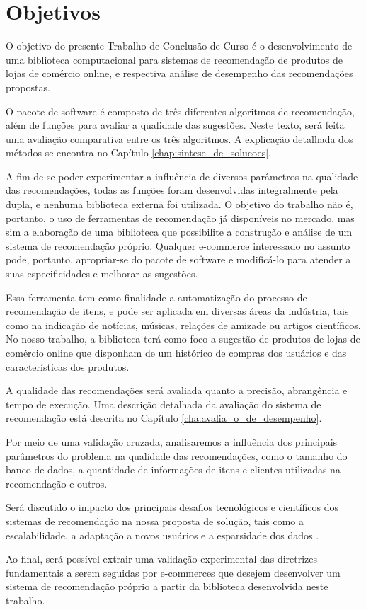 \chapter[Objetivos]{Objetivos}
\label{chap:objetivos}

O objetivo do presente Trabalho de Conclusão de Curso é o desenvolvimento de uma biblioteca computacional para sistemas de recomendação de produtos de lojas de comércio online, e respectiva análise de desempenho das recomendações propostas. 

O pacote de software é composto de três diferentes algoritmos de recomendação, além de funções para avaliar a qualidade das sugestões. Neste texto, será feita uma avaliação comparativa entre os três algoritmos. A explicação detalhada dos métodos se encontra no Capítulo \ref{chap:sintese_de_solucoes}.  

A fim de se poder experimentar a influência de diversos parâmetros na qualidade das recomendações, todas as funções foram desenvolvidas integralmente pela dupla, e nenhuma biblioteca externa foi utilizada. O objetivo do trabalho não é, portanto, o uso de ferramentas de recomendação já disponíveis no mercado, mas sim a elaboração de uma biblioteca que possibilite a construção e análise de um sistema de recomendação  próprio. Qualquer e-commerce interessado no assunto pode, portanto, apropriar-se do pacote de software e modificá-lo para atender a suas especificidades e melhorar as sugestões.

Essa ferramenta tem como finalidade a automatização do processo de recomendação de itens, e pode ser aplicada em diversas áreas da indústria, tais como na indicação de notícias, músicas, relações de amizade ou artigos científicos. No nosso trabalho, a biblioteca terá como foco a sugestão de produtos de lojas de comércio online que disponham de um histórico de compras dos usuários e das características dos produtos.

A qualidade das recomendações será avaliada quanto a precisão, abrangência e tempo de execução. Uma descrição detalhada da avaliação do sistema de recomendação está descrita no Capítulo \ref{cha:avalia_o_de_desempenho}.

Por meio de uma validação cruzada, analisaremos a influência dos principais parâmetros do problema na qualidade das recomendações, como o tamanho do banco de dados, a quantidade de informações de itens e clientes utilizadas na recomendação e outros.

Será discutido o impacto dos principais desafios tecnológicos e científicos dos sistemas de recomendação na nossa proposta de solução, tais como a escalabilidade, a adaptação a novos usuários e a esparsidade dos dados \cite{sarwar2000analysis}.

Ao final, será possível extrair uma validação experimental das diretrizes fundamentais a serem seguidas por e-commerces que desejem desenvolver um sistema de recomendação próprio a partir da biblioteca desenvolvida neste trabalho. 